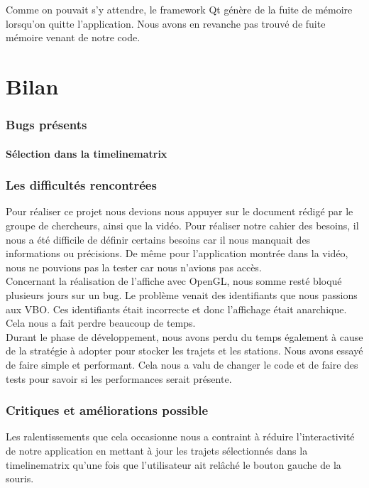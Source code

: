 \documentclass[12pt]{article}
\begin{document}
		Comme on pouvait s’y attendre, le framework Qt génère de la fuite de mémoire
		lorsqu’on quitte l’application.
		Nous avons en revanche pas trouvé de fuite mémoire venant de notre code.
	
\newpage
\part{Bilan}
	\section{Bugs présents}		
		\subsection{Sélection dans la timelinematrix}
		
	\section{Les difficultés rencontrées}
	Pour réaliser ce projet nous devions nous appuyer sur le document rédigé par le groupe de
	chercheurs, ainsi que la vidéo. Pour réaliser notre cahier des besoins, il nous a été
	difficile de définir certains besoins car il nous manquait des informations ou précisions.
	De même pour l’application montrée dans la vidéo, nous ne pouvions pas la tester car nous
	n'avions pas accès.\\

	Concernant la réalisation de l’affiche avec OpenGL, nous somme resté bloqué plusieurs jours
	sur un bug. Le problème venait des identifiants que nous passions aux VBO. Ces identifiants
	était incorrecte et donc l'affichage était anarchique.
	Cela nous a fait perdre beaucoup de temps.\\

	Durant le phase de développement, nous avons perdu du temps également à cause de la
	stratégie à adopter pour stocker les trajets et les stations. Nous avons essayé de faire
	simple et performant. Cela nous a valu de changer le code et de faire des tests pour savoir
	si les performances serait présente.
	
	\section{Critiques et améliorations possible} \label{ameliorations}
	Les ralentissements que cela occasionne nous a contraint à réduire l’interactivité de
	notre application en mettant à jour les trajets sélectionnés dans la timelinematrix qu’une
	fois que l’utilisateur ait relâché le bouton gauche de la souris.
	
\end{document}
